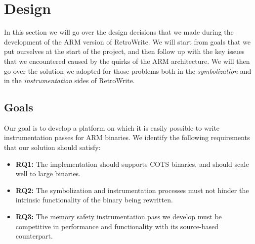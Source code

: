 \documentclass[a4paper,11pt,oneside]{report}
\newcommand{\sysname}{RetroWrite\xspace}
\newcommand{\todo}[1]{%
	\begingroup 
	\sethlcolor{cyan}%
	\hl{TODO: #1}%
	\endgroup
}
\begin{document}



\chapter{Design}

In this section we will go over the design decisions that we made during the 
development of the ARM version of \sysname. We will start from goals that we 
put ourselves at the start of the project, and then follow up with the key 
issues that we encountered caused by the quirks of the ARM architecture. We 
will then go over the solution we adopted for those problems both in the 
\emph{symbolization} and in the \emph{instrumentation} sides of \sysname. 

\section{Goals}


Our goal is to develop a platform on which it is easily possible to write 
instrumentation passes for ARM binaries.  We identify the following 
requirements that our solution should satisfy:

\begin{itemize}
	\item \textbf{RQ1:} The implementation should supports COTS binaries, and 
		should scale well to large binaries.
	\item \textbf{RQ2:} The symbolization and instrumentation processes must 
		not hinder the intrinsic functionality of the binary being rewritten.
	\item \textbf{RQ3:} The memory safety instrumentation pass we develop must 
		be competitive in performance and functionality with its source-based 
		counterpart.


\end{itemize}

	 
\end{document}
